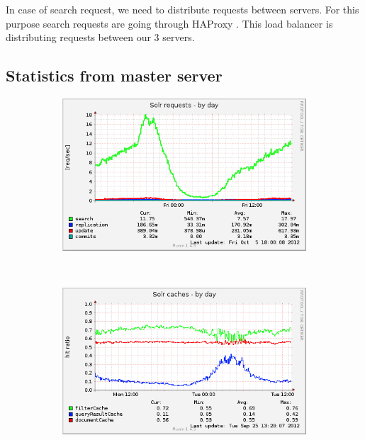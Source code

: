 \documentclass[10pt,a4paper]{article}
\begin{document}
In case of search request, we need to distribute requests between servers. For this purpose search requests are going through HAProxy \cite{HAPROXY}. This load balancer is distributing requests between our 3 servers.

\subsection{Statistics from master server}

\begin{figure}
        \centering
        \begin{subfigure}[b]{0.49\textwidth}
                \centering
                \includegraphics[width=\textwidth]{solr_users_reqs-day}
                \label{fig:solr_users_reqs-day}
        \end{subfigure}%
        ~ %
        \begin{subfigure}[b]{0.49\textwidth}
                \centering
                \includegraphics[width=\textwidth]{solr_users_cache-day}
                \label{fig:solr_users_cache-day}
        \end{subfigure}
        

\end{figure}
\end{document}
